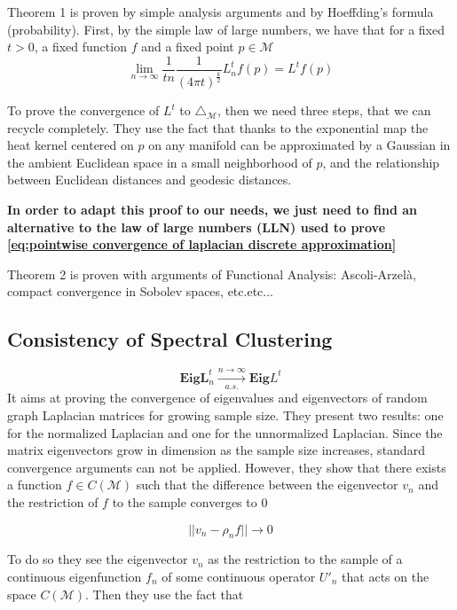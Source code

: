 Theorem 1 is proven by simple analysis arguments and by Hoeffding's formula (probability). 
First, by the simple law of large numbers, we have that for a fixed $t>0$, a fixed function $f$ and a fixed point $p\in\mathcal M$
\begin{equation}\label{eq:pointwise convergence of laplacian discrete approximation}
\lim_{n\to\infty}\frac{1}{tn}\frac{1}{ (4\pi t)^{\frac{k}{2}}}L_n^tf(p)= L^tf(p)
\end{equation}




To prove the convergence of $L^t$ to $\triangle_\mathcal M$, then we need three steps, that we can recycle completely. They use the fact that thanks to the exponential map the heat kernel centered on $p$ on any manifold can be approximated by a Gaussian in the ambient Euclidean space in a small neighborhood of $p$, and the relationship between Euclidean distances and geodesic distances.

\textbf{In order to adapt this proof to our needs, we just need to find an alternative to the law of large numbers (LLN) used to prove \ref{eq:pointwise convergence of laplacian discrete approximation}}

Theorem 2 is proven with arguments of Functional Analysis: Ascoli-Arzelà, compact convergence in Sobolev spaces, etc.etc...

\subsection{Consistency of Spectral Clustering}
 $$ \mathbf{Eig} \mathbf{L}^t_n \xrightarrow[a.s.]{n\to\infty} \mathbf{Eig} L^t $$
It aims at proving the convergence of eigenvalues and eigenvectors of random graph Laplacian matrices for growing sample size. They present two results: one for the normalized Laplacian and one for the unnormalized Laplacian. Since the matrix eigenvectors grow in dimension as the sample size increases, standard convergence arguments can not be applied. However, they show that there exists a function $f\in C(\mathcal M)$ such that the difference between the eigenvector $v_n$ and the restriction of $f$ to the sample converges to $0$

$$||v_n-\rho_nf||\rightarrow 0$$

To do so they see the eigenvector $v_n$ as the restriction to the sample of a continuous eigenfunction $f_n$ of some continuous operator $U'_n$ that acts on the space $C(\mathcal M)$. Then they use the fact that 


